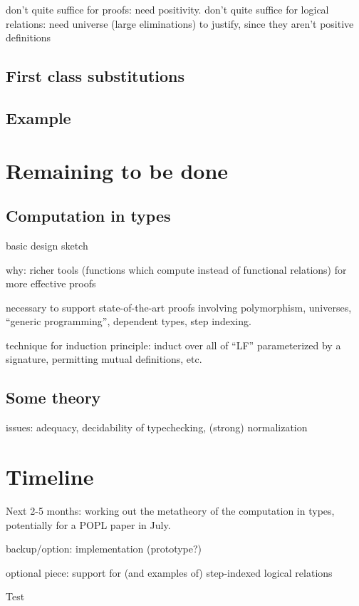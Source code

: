 \documentclass{article}
\begin{document}
don't quite suffice for proofs: need positivity. don't quite suffice
for logical relations: need universe (large eliminations) to justify,
since they aren't positive definitions
\subsection{First class substitutions}

\subsection{Example}
\section{Remaining to be done}
\subsection{Computation in types}
basic design sketch

why: richer tools (functions which compute instead of functional
relations) for more effective proofs

necessary to support state-of-the-art proofs involving polymorphism,
universes, ``generic programming'', dependent types, step indexing.

technique for induction principle: induct over all of ``LF''
parameterized by a signature, permitting mutual definitions, etc.
\subsection{Some theory}

issues: adequacy, decidability of typechecking, (strong) normalization
\section{Timeline}
Next 2-5 months: working out the metatheory of the computation in
types, potentially for a POPL paper in July.

backup/option: implementation (prototype?)

optional piece: support for (and examples of) step-indexed logical
relations

\begin{thebibliography}
Test
\end{thebibliography}
\end{document}
